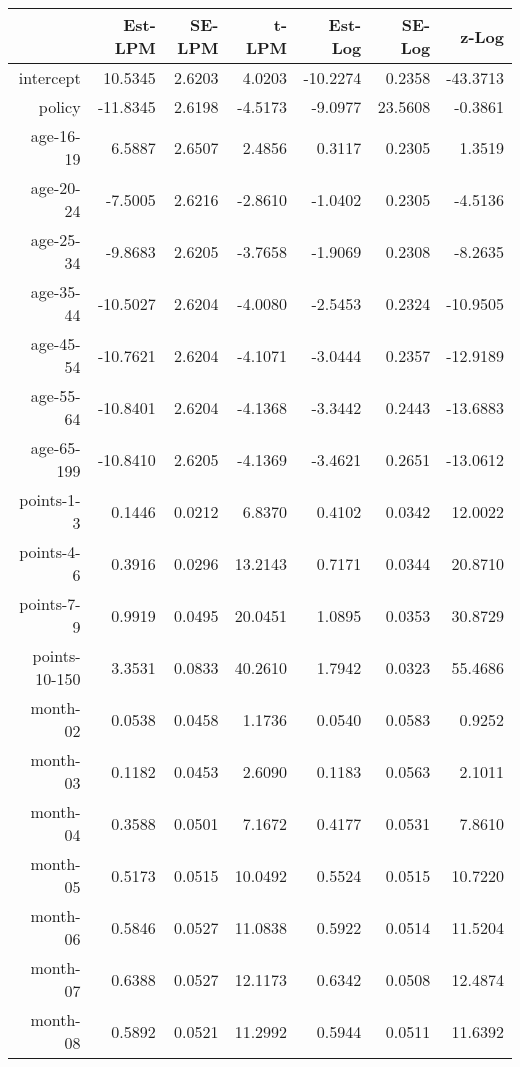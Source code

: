 \documentclass[10pt]{article}
\begin{document}

\begin{table}[ht]
\centering
\begin{tabular}{rrrrrrr}
  \hline
 & Est-LPM & SE-LPM & t-LPM & Est-Log & SE-Log & z-Log \\ 
  \hline
intercept & 10.5345 & 2.6203 & 4.0203 & -10.2274 & 0.2358 & -43.3713 \\ 
  policy & -11.8345 & 2.6198 & -4.5173 & -9.0977 & 23.5608 & -0.3861 \\ 
  age-16-19 & 6.5887 & 2.6507 & 2.4856 & 0.3117 & 0.2305 & 1.3519 \\ 
  age-20-24 & -7.5005 & 2.6216 & -2.8610 & -1.0402 & 0.2305 & -4.5136 \\ 
  age-25-34 & -9.8683 & 2.6205 & -3.7658 & -1.9069 & 0.2308 & -8.2635 \\ 
  age-35-44 & -10.5027 & 2.6204 & -4.0080 & -2.5453 & 0.2324 & -10.9505 \\ 
  age-45-54 & -10.7621 & 2.6204 & -4.1071 & -3.0444 & 0.2357 & -12.9189 \\ 
  age-55-64 & -10.8401 & 2.6204 & -4.1368 & -3.3442 & 0.2443 & -13.6883 \\ 
  age-65-199 & -10.8410 & 2.6205 & -4.1369 & -3.4621 & 0.2651 & -13.0612 \\ 
  points-1-3 & 0.1446 & 0.0212 & 6.8370 & 0.4102 & 0.0342 & 12.0022 \\ 
  points-4-6 & 0.3916 & 0.0296 & 13.2143 & 0.7171 & 0.0344 & 20.8710 \\ 
  points-7-9 & 0.9919 & 0.0495 & 20.0451 & 1.0895 & 0.0353 & 30.8729 \\ 
  points-10-150 & 3.3531 & 0.0833 & 40.2610 & 1.7942 & 0.0323 & 55.4686 \\ 
  month-02 & 0.0538 & 0.0458 & 1.1736 & 0.0540 & 0.0583 & 0.9252 \\ 
  month-03 & 0.1182 & 0.0453 & 2.6090 & 0.1183 & 0.0563 & 2.1011 \\ 
  month-04 & 0.3588 & 0.0501 & 7.1672 & 0.4177 & 0.0531 & 7.8610 \\ 
  month-05 & 0.5173 & 0.0515 & 10.0492 & 0.5524 & 0.0515 & 10.7220 \\ 
  month-06 & 0.5846 & 0.0527 & 11.0838 & 0.5922 & 0.0514 & 11.5204 \\ 
  month-07 & 0.6388 & 0.0527 & 12.1173 & 0.6342 & 0.0508 & 12.4874 \\ 
  month-08 & 0.5892 & 0.0521 & 11.2992 & 0.5944 & 0.0511 & 11.6392 \\ 

\end{tabular}
\end{table}
\end{document}
